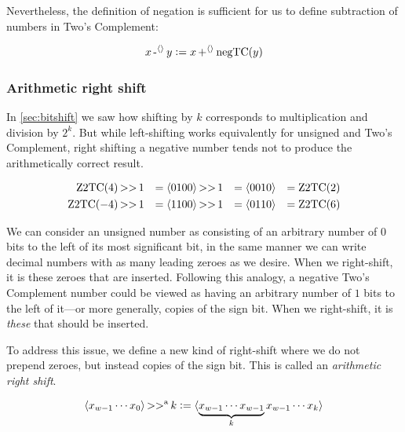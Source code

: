 Nevertheless, the definition of negation is sufficient for us to
define subtraction of numbers in Two's Complement:

\begin{definition}
  \begin{align*}
    x \operatorname{-^{\langle\rangle}} y \vcentcolon= x \operatorname{+^{\langle\rangle}} \mathrm{negTC}(y)
  \end{align*}
  \label{def:intsub}
\end{definition}

\subsubsection{Arithmetic right shift}

In \cref{sec:bitshift} we saw how shifting by $k$ corresponds to
multiplication and division by $2^{k}$.  But while left-shifting works
equivalently for unsigned and Two's Complement, right shifting a
negative number tends not to produce the arithmetically correct result.

\begin{example}
  \begin{align}
    \mathrm{Z2TC}(4) \operatorname{>>} 1 &&= \langle 0100 \rangle \operatorname{>>} 1 &&= \langle 0010 \rangle &&= \mathrm{Z2TC}(2) \\
    \mathrm{Z2TC}(-4) \operatorname{>>} 1 &&= \langle 1100 \rangle \operatorname{>>} 1 &&= \langle 0110 \rangle &&= \mathrm{Z2TC}(6)
  \end{align}
\end{example}

We can consider an unsigned number as consisting of an arbitrary number
of $0$ bits to the left of its most significant bit, in the same
manner we can write decimal numbers with as many leading zeroes as we
desire.  When we right-shift, it is these zeroes that are inserted.
Following this analogy, a negative Two's Complement number could be
viewed as having an arbitrary number of $1$ bits to the left of
it---or more generally, copies of the sign bit.  When we right-shift,
it is \emph{these} that should be inserted.

To address this issue, we define a new kind of right-shift where we do
not prepend zeroes, but instead copies of the sign bit.  This is
called an \emph{arithmetic right shift}.

\begin{definition}
  \begin{align*}
    \langle x_{w-1}\cdots{}x_{0} \rangle \operatorname{>>^{a}} k \vcentcolon=
    \langle \underbrace{x_{w-1} \cdots x_{w-1}}_{k} x_{w-1}\cdots{}x_{k} \rangle
  \end{align*}
  \label{def:bits-rightshift-arithmetic}
\end{definition}

